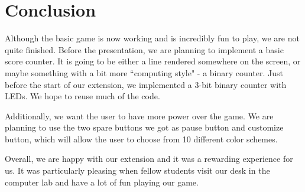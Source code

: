 \documentclass[9pt]{article}
\begin{document}
\section*{Conclusion}
Although the basic game is now working and is incredibly fun to play, we are not quite finished. Before the presentation, we are planning to implement a basic score counter. It is going to be either a line rendered somewhere on the screen, or maybe something with a bit more ``computing style" - a binary counter. Just before the start of our extension, we implemented a 3-bit binary counter with LEDs. We hope to reuse much of the code.

Additionally, we want the user to have more power over the game. We are planning to use the two spare buttons we got as pause button and customize button, which will allow the user to choose from 10 different color schemes.

Overall, we are happy with our extension and it was a rewarding experience for us. It was particularly pleasing when fellow students visit our desk in the computer lab and have a lot of fun playing our game. 
\end{document}
